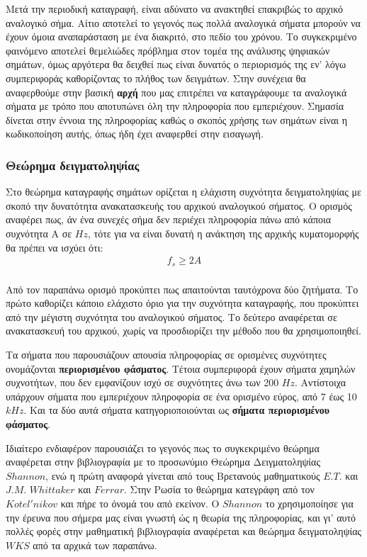 \documentclass[breaklines=true, 12pt]{article}
\begin{document}
Μετά την περιοδική καταγραφή, είναι αδύνατο να ανακτηθεί επακριβώς το αρχικό
αναλογικό σήμα. Αίτιο αποτελεί το γεγονός πως πολλά αναλογικά σήματα μπορούν
να έχουν όμοια αναπαράσταση με ένα διακριτό, στο πεδίο του χρόνου. Το
συγκεκριμένο φαινόμενο αποτελεί θεμελιώδες πρόβλημα στον τομέα της ανάλυσης
ψηφιακών σημάτων, όμως αργότερα θα δειχθεί πως είναι δυνατός ο περιορισμός
της εν' λόγω συμπεριφοράς καθορίζοντας το πλήθος των δειγμάτων. Στην
συνέχεια θα αναφερθούμε στην βασική \textbf{αρχή} που μας επιτρέπει να καταγράφουμε
τα αναλογικά σήματα με τρόπο που αποτυπώνει όλη την πληροφορία που
εμπεριέχουν. Σημασία δίνεται στην έννοια της πληροφορίας καθώς ο σκοπός
χρήσης των σημάτων είναι η κωδικοποίηση αυτής, όπως ήδη έχει αναφερθεί
στην εισαγωγή.
\subsubsection{Θεώρημα δειγματοληψίας}
\label{sec:org990d496}
Στο θεώρημα καταγραφής σημάτων ορίζεται η ελάχιστη συχνότητα δειγματοληψίας με
σκοπό την δυνατότητα ανακατασκευής του αρχικού αναλογικού σήματος. Ο ορισμός αναφέρει
πως, άν ένα συνεχές σήμα δεν περιέχει πληροφορία πάνω από κάποια συχνότητα Α σε
\(Hz\), τότε για να είναι δυνατή η ανάκτηση της αρχικής κυματομορφής θα πρέπει να
ισχύει ότι:
\begin{equation}
\begin{align}
f_{s} \geq 2A \\
\end{align}
\end{equation}

Από τον παραπάνω ορισμό προκύπτει πως απαιτούνται ταυτόχρονα δύο ζητήματα. Το
πρώτο καθορίζει κάποιο ελάχιστο όριο για την συχνότητα καταγραφής, που προκύπτει
από την μέγιστη συχνότητα του αναλογικού σήματος. Το δεύτερο αναφέρεται σε
ανακατασκευή του αρχικού, χωρίς να προσδιορίζει την μέθοδο που θα χρησιμοποιηθεί.

Τα σήματα που παρουσιάζουν απουσία πληροφορίας σε ορισμένες συχνότητες ονομάζονται
\textbf{περιορισμένου φάσματος}. Τέτοια συμπεριφορά έχουν σήματα χαμηλών συχνοτήτων, που δεν
εμφανίζουν ισχύ σε συχνότητες άνω των 200 \(Hz\). Αντίστοιχα υπάρχουν σήματα που
εμπεριέχουν πληροφορία σε ένα ορισμένο εύρος, από 7 έως 10 \(kHz\). Και τα δύο αυτά
σήματα κατηγοριοποιούνται ως \textbf{σήματα περιορισμένου φάσματος}.

Ιδιαίτερο ενδιαφέρον παρουσιάζει το γεγονός πως το συγκεκριμένο θεώρημα αναφέρεται
στην βιβλιογραφία με το προσωνύμιο Θεώρημα Δειγματοληψίας \(Shannon\), ενώ
η πρώτη αναφορά γίνεται από τους Βρετανούς μαθηματικούς \(E.T.\) και \(J.M.\)
\(Whittaker\) και \(Ferrar\). Στην Ρωσία το θεώρημα κατεγράφη από τον
\(Kotel'nikov\) και πήρε το όνομά του από εκείνον. Ο \(Shannon\)
το χρησιμοποίησε για την έρευνα που σήμερα μας είναι γνωστή ώς η θεωρία της
πληροφορίας, και γι' αυτό πολλές φορές στην μαθηματική βιβλιογραφία
αναφέρεται και θεώρημα δειγματοληψίας \(WKS\) από τα αρχικά των παραπάνω.
\end{document}
